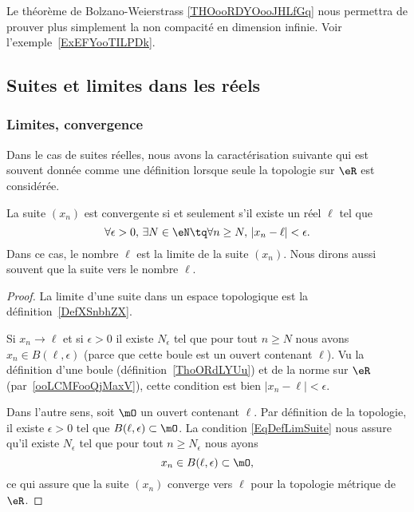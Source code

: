 Le théorème de Bolzano-Weierstrass \ref{THOooRDYOooJHLfGq} nous permettra de prouver plus simplement la non compacité en dimension infinie. Voir l'exemple~\ref{ExEFYooTILPDk}.


\subsection{Suites et limites dans les réels}

\subsubsection{Limites, convergence}


Dans le cas de suites réelles, nous avons la caractérisation suivante qui est souvent donnée comme une définition lorsque seule la topologie sur \( \eR\) est considérée.
\begin{proposition}	\label{PropLimiteSuiteNum}
	La suite $(x_n)$ est convergente si et seulement s'il existe un réel $\ell$ tel que
	\begin{equation}		\label{EqDefLimSuite}
		\forall \epsilon>0,\,\exists N\in\eN\tq\forall n\geq N,\,| x_n-\ell |<\epsilon.
	\end{equation}
	Dans ce cas, le nombre $\ell$ est la limite de la suite $(x_n)$. Nous dirons aussi souvent que la suite  vers le nombre $\ell$.
\end{proposition}

\begin{proof}
    La limite d'une suite dans un espace topologique est la définition~\ref{DefXSnbhZX}.

    Si \( x_n\to \ell\) et si \( \epsilon>0\) il existe \( N_{\epsilon}\) tel que pour tout \( n\geq N\) nous avons \( x_n\in B(\ell,\epsilon)\) (parce que cette boule est un ouvert contenant \( \ell\)). Vu la définition d'une boule (définition~\ref{ThoORdLYUu}) et de la norme sur \( \eR\) (par~\ref{ooLCMFooQjMaxV}), cette condition est bien \( | x_n-\ell |<\epsilon\).

    Dans l'autre sens, soit \( \mO\) un ouvert contenant \( \ell\). Par définition de la topologie, il existe \( \epsilon>0\) tel que \( B(\ell,\epsilon)\subset \mO\). La condition \eqref{EqDefLimSuite} nous assure qu'il existe \( N_{\epsilon} \) tel que pour tout \( n\geq N_{\epsilon}\) nous ayons
    \begin{equation}
        x_n\in B(\ell,\epsilon)\subset\mO,
    \end{equation}
    ce qui assure que la suite \( (x_n)\) converge vers \( \ell\) pour la topologie métrique de \( \eR\).
\end{proof}


